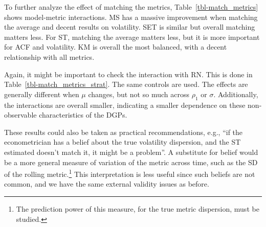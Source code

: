 \documentclass[
  letterpaper,
  DIV=11,
  numbers=noendperiod]{scrartcl}
\numberwithin{equation}{section}
\numberwithin{table}{section}
\numberwithin{figure}{section}
\begin{document}
\begin{table}[!htbp]

\caption{\label{tbl-match_r2}RMSE and \(R^2\) across models}

\centering{



}

\end{table}%

To further analyze the effect of matching the metrics,
Table~\ref{tbl-match_metrics} shows model-metric interactions. MS has a
massive improvement when matching the average and decent results on
volatility. SET is similar but overall matching matters less. For ST,
matching the average matters less, but it is more important for ACF and
volatility. KM is overall the most balanced, with a decent relationship
with all metrics.

\begin{table}[!htbp]

\caption{\label{tbl-match_metrics}RMSE and metrics identification across
models}

\centering{



}

\end{table}%

Again, it might be important to check the interaction with RN. This is
done in Table~\ref{tbl-match_metrics_strat}. The same controls are used.
The effects are generally different when \(\mu\) changes, but not so
much across \(\rho_1\) or \(\sigma\). Additionally, the interactions are
overall smaller, indicating a smaller dependence on these non-observable
characteristics of the DGPs.

\begin{table}[!htbp]

\caption{\label{tbl-match_metrics_strat}Models and estimated RC metrics
- RN interactions}

\centering{



}

\end{table}%

These results could also be taken as practical recommendations, e.g.,
``if the econometrician has a belief about the true volatility
dispersion, and the ST estimated doesn't match it, it might be a
problem''. A substitute for belief would be a more general measure of
variation of the metric across time, such as the SD of the rolling
metric.\footnote{The prediction power of this measure, for the true
  metric dispersion, must be studied.} This interpretation is less
useful since such beliefs are not common, and we have the same external
validity issues as before.
\end{document}
